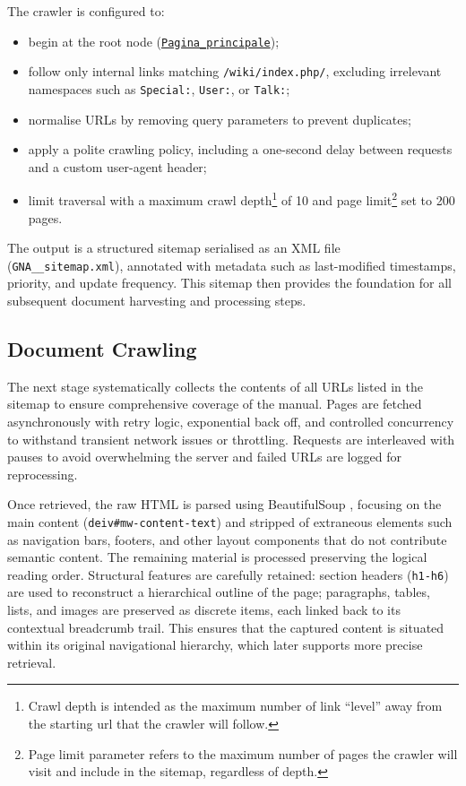 \begin{spacing}{1.5}
The crawler is configured to:
\begin{itemize}
      \item begin at the root node (\texttt{\href{https://web.archive.org/web/20250803092155/https://gna.cultura.gov.it/wiki/index.php/Pagina_principale}{Pagina\_principale}}\nocite{noauthor_wiki_2025});
      \item follow only internal links matching \texttt{/wiki/index.php/}, excluding irrelevant namespaces such as \texttt{Special:}, \texttt{User:}, or \texttt{Talk:};
      \item normalise URLs by removing query parameters to prevent duplicates;
      \item apply a polite crawling policy, including a one-second delay between requests and a custom user-agent header;
      \item limit traversal with a maximum crawl depth\footnote{Crawl depth is intended as the maximum number of link ``level'' away from the starting url that the crawler will follow.} of 10 and page limit\footnote{Page limit parameter refers to the maximum number of pages the crawler will visit and include in the sitemap, regardless of depth.} set to 200 pages.
\end{itemize}

The output is a structured sitemap serialised as an XML file (\texttt{GNA\_\_sitemap.xml}), annotated with metadata such as last-modified timestamps, priority, and update frequency. This sitemap then provides the foundation for all subsequent document harvesting and processing steps.

\subsection{Document Crawling}
The next stage systematically collects the contents of all URLs listed in the sitemap to ensure comprehensive coverage of the manual. Pages are fetched asynchronously with retry logic, exponential back off, and controlled concurrency to withstand transient network issues or throttling. Requests are interleaved with pauses to avoid overwhelming the server and failed URLs are logged for reprocessing.

Once retrieved, the raw HTML is parsed using BeautifulSoup \parencite{hajba_website_2018}, focusing on the main content (\texttt{deiv\#mw-content-text}) and stripped of extraneous elements such as navigation bars, footers, and other layout components that do not contribute semantic content. The remaining material is processed preserving the logical reading order. Structural features are carefully retained: section headers (\texttt{h1-h6}) are used to reconstruct a hierarchical outline of the page; paragraphs, tables, lists, and images are preserved as discrete items, each linked back to its contextual breadcrumb trail. This ensures that the captured content is situated within its original navigational hierarchy, which later supports more precise retrieval.


\end{spacing}
